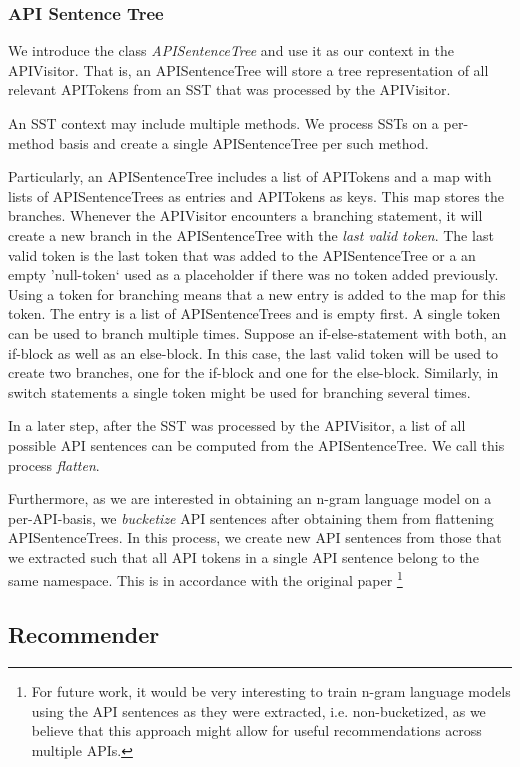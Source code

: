 \subsubsection{API Sentence Tree}
\label{section-apisentencetree}

We introduce the class \textit{APISentenceTree} and use it as our context in the APIVisitor. That is, an APISentenceTree will store a tree representation of all relevant APITokens from an SST that was processed by the APIVisitor.

An SST context may include multiple methods. We process SSTs on a per-method basis and create a single APISentenceTree per such method.

Particularly, an APISentenceTree includes a list of APITokens and a map with lists of APISentenceTrees as entries and APITokens as keys. This map stores the branches.
Whenever the APIVisitor encounters a branching statement, it will create a new branch in the APISentenceTree with the \textit{last valid token}. The last valid token is the last token that was added to the APISentenceTree or a an empty 'null-token` used as a placeholder if there was no token added previously.
Using a token for branching means that a new entry is added to the map for this token.
The entry is a list of APISentenceTrees and is empty first.
A single token can be used to branch multiple times. Suppose an if-else-statement with both, an if-block as well as an else-block. In this case, the last valid token will be used to create two branches, one for the if-block and one for the else-block.
Similarly, in switch statements a single token might be used for branching several times.

In a later step, after the SST was processed by the APIVisitor, a list of all possible API sentences can be computed from the APISentenceTree. We call this process \textit{flatten}.

Furthermore, as we are interested in obtaining an n-gram language model on a per-API-basis, we \textit{bucketize} API sentences after obtaining them from flattening APISentenceTrees. In this process, we create new API sentences from those that we extracted such that all API tokens in a single API sentence belong to the same namespace.
This is in accordance with the original paper \cite{Santos2017stepwise}\footnote{For future work, it would be very interesting to train n-gram language models using the API sentences as they were extracted, i.e. non-bucketized, as we believe that this approach might allow for useful recommendations across multiple APIs.}






\subsection{Recommender}

